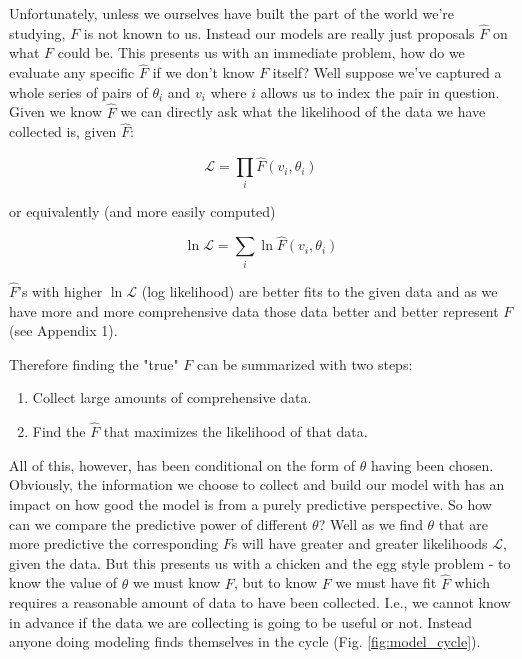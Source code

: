 \documentclass[11pt]{article}
\begin{document}
Unfortunately, unless we ourselves have built the part of the world we're studying, $F$ is not known to us. Instead our models are really just proposals $\hat{F}$ on what $F$ could be. This presents us with an immediate problem, how do we evaluate any specific $\hat{F}$ if we don't know $F$ itself? Well suppose we've captured a whole series of pairs of $\theta_i$ and $v_i$ where $i$ allows us to index the pair in question. Given we know $\hat{F}$ we can directly ask what the likelihood of the data we have collected is, given $\hat{F}$:

$$\mathcal{L}=\prod_i \hat{F}(v_i, \theta_i)$$

or equivalently (and more easily computed)

$$\ln \mathcal{L} = \sum_i \ln \hat{F}(v_i, \theta_i)$$

$\hat{F}$'s with higher $\ln \mathcal{L}$ (log likelihood) are better fits to the given data and as we have more and more comprehensive data those data better and better represent $F$ (see Appendix 1).

Therefore finding the "true" $F$ can be summarized with two steps:

\begin{enumerate}
\item Collect large amounts of comprehensive data.
\item Find the $\hat{F}$ that maximizes the likelihood of that data.
\end{enumerate}

All of this, however, has been conditional on the form of $\theta$ having been chosen. Obviously, the information we choose to collect and build our model with has an impact on how good the model is from a purely predictive perspective. So how can we compare the predictive power of different $\theta$? Well as we find $\theta$ that are more predictive the corresponding $F$s will have greater and greater likelihoods $\mathcal{L}$, given the data. But this presents us with a chicken and the egg style problem - to know the value of $\theta$ we must know $F$, but to know $F$ we must have fit $\hat{F}$ which requires a reasonable amount of data to have been collected. I.e., we cannot know in advance if the data we are collecting is going to be useful or not. Instead anyone doing modeling finds themselves in the cycle (Fig. \ref{fig:model_cycle}).
\end{document}
